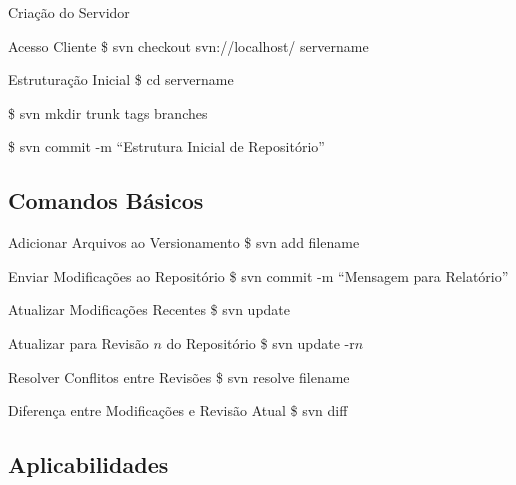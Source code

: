 \documentclass[hyperref={pdfpagelabels=false}]{beamer}
\begin{document}
\begin{frame}{Criação do Servidor}
    \begin{block}{Acesso Cliente}
        \$ svn checkout svn://localhost/ servername
    \end{block}
    \begin{block}{Estruturação Inicial}
        \$ cd servername

        \$ svn mkdir trunk tags branches

        \$ svn commit -m ``Estrutura Inicial de Repositório''
    \end{block}
\end{frame}

\subsection{Comandos Básicos}

\begin{frame}
    \begin{block}{Adicionar Arquivos ao Versionamento}
        \$ svn add filename
    \end{block}
    \begin{block}{Enviar Modificações ao Repositório}
        \$ svn commit -m ``Mensagem para Relatório''
    \end{block}
    \begin{block}{Atualizar Modificações Recentes}
        \$ svn update
    \end{block}
    \begin{block}{Atualizar para Revisão $n$ do Repositório}
        \$ svn update -r$n$
    \end{block}
    \begin{block}{Resolver Conflitos entre Revisões}
        \$ svn resolve filename
    \end{block}
    \begin{block}{Diferença entre Modificações e Revisão Atual}
        \$ svn diff
    \end{block}
\end{frame}

\subsection{Aplicabilidades}
\end{document}
